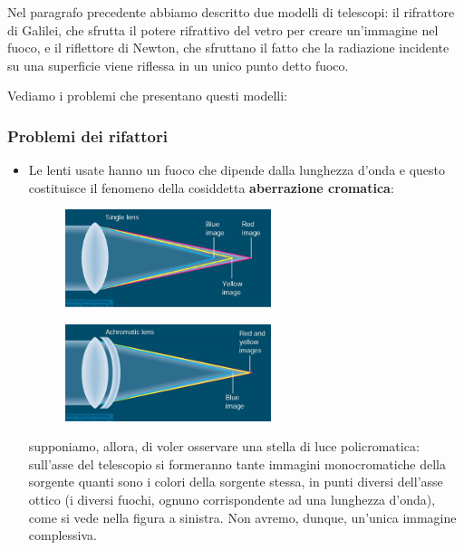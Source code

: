 Nel paragrafo precedente abbiamo descritto due modelli di telescopi: il rifrattore di Galilei, che sfrutta il potere rifrattivo del vetro per creare un'immagine nel fuoco, e il riflettore di Newton, che sfruttano il fatto che la radiazione incidente su una superficie viene riflessa in un unico punto detto fuoco.

Vediamo i problemi che presentano questi modelli:

\subsubsection{Problemi dei rifattori}

\begin{itemize}
\item Le lenti usate hanno un fuoco che dipende dalla lunghezza d'onda e questo costituisce il fenomeno della cosiddetta \textbf{aberrazione cromatica}:

\vspace{-0.3cm}

\begin{minipage}{0.45\textwidth}
    \begin{figure}[H]
        \centering
        \includegraphics[width=6cm]{immagini/aberrazione_cromatica.png}
    \end{figure}
\end{minipage}
\begin{minipage}{0.5\textwidth}
    \begin{figure}[H]
        \centering
        \includegraphics[width=6cm]{immagini/lenti_acromatiche.png}
    \end{figure}
\end{minipage}

\vspace{0.2cm}

supponiamo, allora, di voler osservare una stella di luce policromatica: sull'asse del telescopio si formeranno tante immagini monocromatiche della sorgente quanti sono i colori della sorgente stessa, in punti diversi dell'asse ottico (i diversi fuochi, ognuno corrispondente ad una lunghezza d'onda), come si vede nella figura a sinistra. Non avremo, dunque, un'unica immagine complessiva.


\end{itemize}

